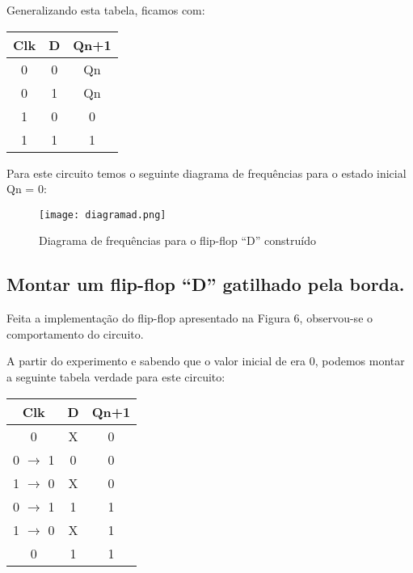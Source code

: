 \documentclass[12pt]{article}
\begin{document}
Generalizando esta tabela, ficamos com:

\begin{table}[H]
	\centering
	\begin{tabular}{|c|c|c|}
		\cline{1-3}
		\multicolumn{1}{|c|}{Clk} & \multicolumn{1}{|c|}{D} & \multicolumn{1}{|c|}{Qn+1} \\
		\hline
		0 & 0 & Qn \\
		\hline
		0 & 1 & Qn \\
		\hline
		1 & 0 & 0 \\
		\hline
		1 & 1 & 1 \\
		\hline
	\end{tabular}
\end{table}

Para este circuito temos o seguinte diagrama de frequências para o estado inicial Qn = 0:

\begin{figure}[H]
	\centering
	\texttt{[image: diagramad.png]}
	\caption{Diagrama de frequências para o flip-flop “D” construído}
	\label{fig:diagramad}
\end{figure}

\subsection{Montar um flip-flop “D” gatilhado pela borda.}

Feita a implementação do flip-flop apresentado na Figura 6, observou-se o comportamento do circuito.

A partir do experimento e sabendo que o valor inicial de  era 0, podemos montar a seguinte tabela verdade para este circuito:

\begin{table}[H]
	\centering
	\begin{tabular}{|c|c|c|}
		\cline{1-3}
		\multicolumn{1}{|c|}{Clk} & \multicolumn{1}{|c|}{D} & \multicolumn{1}{|c|}{Qn+1} \\
		\hline
		0 & X & 0 \\
		\hline
		0 $\rightarrow$ 1 & 0 & 0 \\
		\hline
		1 $\rightarrow$ 0 & X & 0 \\
		\hline
		0 $\rightarrow$ 1 & 1 & 1 \\
		\hline
		1 $\rightarrow$ 0 & X & 1 \\
		\hline
		0 & 1 & 1 \\
		\hline
	\end{tabular}
\end{table}
\end{document}

